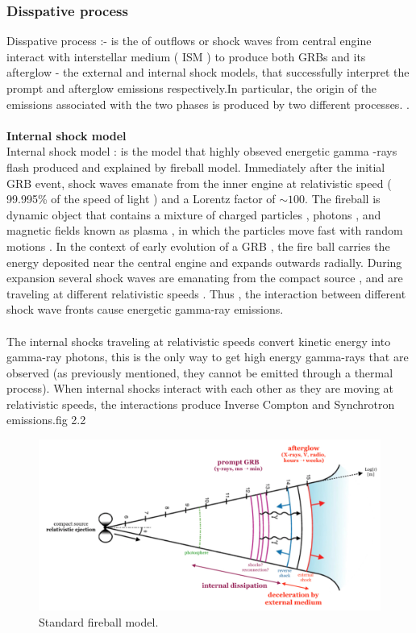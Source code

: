 \subsubsection{Disspative process}
Disspative process :- is the  of outflows or shock waves from central engine  interact with interstellar medium ( ISM ) to produce both GRBs and its afterglow - the external and internal shock models, that  successfully interpret the prompt and afterglow emissions respectively.In particular, the origin of the emissions associated with the two phases is produced by two different processes. \citep{8} \citep{17}.\\\\
\textbf{Internal shock model}\\
 Internal shock  model :  is  the  model  that    highly   obseved   energetic  gamma -rays  flash  produced  and   explained  by fireball model.  Immediately  after the initial GRB event, shock waves emanate from the inner engine  at  relativistic  speed   (   99.995\%   of  the speed of light ) and  a Lorentz factor of $ \sim 100 $. The fireball is  dynamic  object  that contains  a  mixture  of charged  particles , photons , and  magnetic  fields  known   as  plasma , in which the particles move  fast with  random   motions . In the context of early  evolution  of a GRB , the fire ball  carries  the  energy  deposited  near  the  central engine  and  expands outwards  radially. During  expansion  several  shock  waves  are  emanating from the compact source , and   are  traveling  at  different  relativistic  speeds . Thus , the  interaction  between  different  shock  wave  fronts   cause   energetic gamma-ray emissions. \citep{17}\citep{18}\\\\
The internal shocks  traveling  at relativistic  speeds  convert  kinetic energy into gamma-ray  photons, this is  the only  way to  get high  energy gamma-rays that are observed (as previously mentioned, they cannot be emitted through a thermal process). When  internal shocks interact with  each  other as they  are  moving  at  relativistic  speeds, the  interactions  produce  Inverse  Compton and Synchrotron emissions.fig 2.2 \citep{18} 
\begin{figure}[h]
\begin{center}
\includegraphics[scale=0.3]{Figures/fig6.png}
\caption{Standard fireball model.}
\end{center}
\end{figure}

